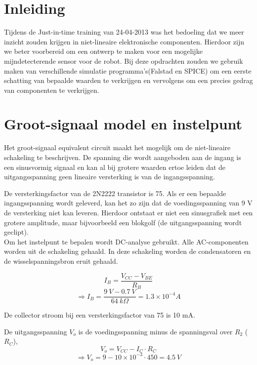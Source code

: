 \documentclass{report}
\begin{document}
\section{Inleiding}
Tijdens de Just-in-time training van 24-04-2013 was het bedoeling dat we meer inzicht zouden krijgen in niet-lineaire elektronische componenten. Hierdoor 
zijn we beter voorbereid om een ontwerp te maken voor een mogelijke mijndetecterende sensor voor de robot. Bij deze opdrachten zouden we gebruik maken van verschillende simulatie programma's(Falstad en SPICE)
om een eerste schatting van bepaalde waarden te verkrijgen en vervolgens om een precies gedrag van componenten te verkrijgen.



\section{Groot-signaal model en instelpunt}

Het groot-signaal equivalent circuit maakt het mogelijk om de niet-lineaire schakeling te beschrijven. De spanning die wordt aangeboden aan de ingang is een sinusvormig signaal en kan al bij grotere waarden ertoe leiden dat de uitgangsspanning geen lineaire versterking is van de ingangsspanning.

De versterkingsfactor van de 2N2222 transistor is 75. Als er een bepaalde ingangsspanning wordt geleverd, kan het zo zijn dat de voedingsspanning van 9 V de versterking niet kan leveren. Hierdoor ontstaat er niet een sinusgrafiek met een grotere amplitude, maar bijvoorbeeld een blokgolf (de uitgangsspanning wordt geclipt).\\

Om het instelpunt te bepalen wordt DC-analyse gebruikt. Alle AC-componenten worden uit de schakeling gehaald. In deze schakeling worden de condensatoren en de wisselspanningsbron eruit gehaald.

\begin{equation}
I_B=\frac{V_{CC}-V_{BE}}{R_B}
\end{equation}
$$\Rightarrow I_B=\frac{9\: V-0.7 \: V}{64 \: k \Omega}=1.3\times 10^{-4}A$$

\noindent De collector stroom bij een versterkingsfactor van 75 is 10 mA. 

\noindent De uitgangsspanning $V_o$ is de voedingsspanning minus de spanningsval over $R_2$ ($R_C$),
\begin{equation}
V_o=V_{CC}-I_{C} \cdot R_{C}
\end{equation}
$$\Rightarrow V_o=9-10\times 10^{-3}\cdot 450=4.5 \: V$$
\end{document}
